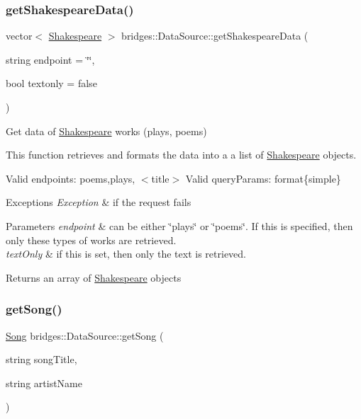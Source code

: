 \subsubsection{\texorpdfstring{get\+Shakespeare\+Data()}{getShakespeareData()}}
{\footnotesize\ttfamily vector$<$ \mbox{\hyperlink{classbridges_1_1_shakespeare}{Shakespeare}} $>$ bridges\+::\+Data\+Source\+::get\+Shakespeare\+Data (\begin{DoxyParamCaption}\item[{string}]{endpoint = {\ttfamily \char`\"{}\char`\"{}},  }\item[{bool}]{textonly = {\ttfamily false} }\end{DoxyParamCaption})}

Get data of \mbox{\hyperlink{classbridges_1_1_shakespeare}{Shakespeare}} works (plays, poems)

This function retrieves and formats the data into a a list of \mbox{\hyperlink{classbridges_1_1_shakespeare}{Shakespeare}} objects.

Valid endpoints\+: \textquotesingle{}poems\textquotesingle{},\textquotesingle{}plays\textquotesingle{}, $<$title$>$ Valid query\+Params\+: format\{simple\}


\begin{DoxyExceptions}{Exceptions}
{\em Exception} & if the request fails\\
\hline
\end{DoxyExceptions}

\begin{DoxyParams}{Parameters}
{\em endpoint} & can be either \char`\"{}plays\char`\"{} or \char`\"{}poems\char`\"{}. If this is specified, then only these types of works are retrieved. \\
\hline
{\em text\+Only} & if this is set, then only the text is retrieved.\\
\hline
\end{DoxyParams}
\begin{DoxyReturn}{Returns}
an array of \mbox{\hyperlink{classbridges_1_1_shakespeare}{Shakespeare}} objects 
\end{DoxyReturn}
\mbox{\label{namespacebridges_1_1_data_source_a284c9d572415b67df6989ab8ab97d0e2}} 
\subsubsection{\texorpdfstring{get\+Song()}{getSong()}}
{\footnotesize\ttfamily \mbox{\hyperlink{classbridges_1_1_song}{Song}} bridges\+::\+Data\+Source\+::get\+Song (\begin{DoxyParamCaption}\item[{string}]{song\+Title,  }\item[{string}]{artist\+Name }\end{DoxyParamCaption})}

